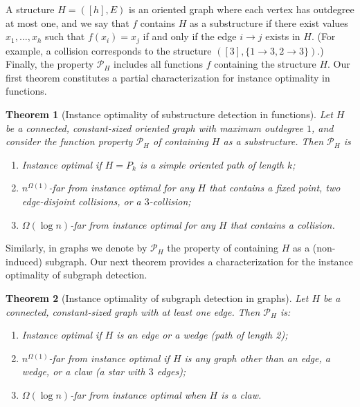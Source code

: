 \documentclass[11pt]{article}
\numberwithin{equation}{section}
\newtheorem{theorem}{Theorem}[section]
\renewcommand{\P}{\mathcal{P}}
\newcommand{\1}{\mathbf{1}}
\begin{document}
A structure $H = ([h], E)$ is an oriented graph where each vertex has outdegree at most one, and we say that $f$ contains $H$ as a substructure if there exist values $x_1, \ldots, x_{h}$ such that $f(x_i) = x_j$ if and only if the edge $i\to j$ exists in $H$. (For example, a collision corresponds to the structure $([3], \{1\to 3, 2 \to 3\})$.) Finally, the property $\mathcal{P}_H$ includes all functions $f$ containing the structure $H$. Our first theorem constitutes a partial characterization for instance optimality in functions.

\begin{theorem} [Instance optimality of substructure detection in functions]\label{thm:main}
Let $H$ be a connected, constant-sized oriented graph with maximum outdegree $1$, and consider the function property $\mathcal{P}_H$ of containing $H$ as a substructure. Then $\P_H$ is
\begin{enumerate}
\item Instance optimal if $H=P_k$ is a simple oriented path of length $k$;
\item $n^{\Omega(1)}$-far from instance optimal for any $H$ that contains a fixed point, two edge-disjoint collisions, or a $3$-collision;
\item \label{funcpart3} $\Omega(\log n)$-far from instance optimal for any $H$ that contains a collision.
\end{enumerate}

\end{theorem}

Similarly, in graphs we denote by $\mathcal{P}_H$ the property of containing $H$ as a (non-induced) subgraph. Our next theorem provides a characterization for the instance optimality of subgraph detection. 

\begin{theorem} [Instance optimality of subgraph detection in graphs]\label{thm:graphconstantcharacterization}
Let $H$ be a connected, constant-sized graph with at least one edge. Then $\mathcal{P}_H$ is:
\begin{enumerate}
\item Instance optimal if $H$ is an edge or a wedge (path of length 2);
\item $n^{\Omega(1)}$-far from instance optimal if $H$ is any graph other than an edge, a wedge, or a claw (a star with $3$ edges);
\item \label{graph:part3} $\Omega(\log n)$-far from instance optimal when $H$ is a claw.
  \end{enumerate}
\end{theorem}
\end{document}
